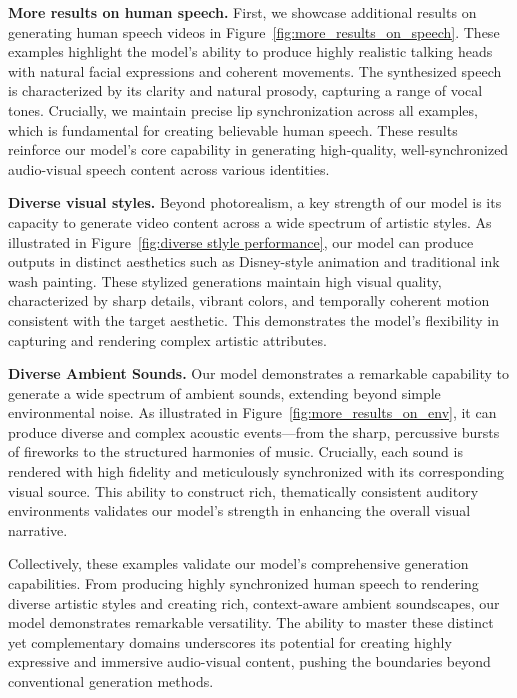 \noindent\textbf{More results on human speech.} 
First, we showcase additional results on generating human speech videos in Figure~\ref{fig:more_results_on_speech}. These examples highlight the model's ability to produce highly realistic talking heads with natural facial expressions and coherent movements. The synthesized speech is characterized by its clarity and natural prosody, capturing a range of vocal tones. Crucially, we maintain precise lip synchronization across all examples, which is fundamental for creating believable human speech. These results reinforce our model's core capability in generating high-quality, well-synchronized audio-visual speech content across various identities.

\noindent\textbf{Diverse visual styles.} 
Beyond photorealism, a key strength of our model is its capacity to generate video content across a wide spectrum of artistic styles. As illustrated in Figure~\ref{fig:diverse stlyle performance}, our model can produce outputs in distinct aesthetics such as Disney-style animation and traditional ink wash painting. These stylized generations maintain high visual quality, characterized by sharp details, vibrant colors, and temporally coherent motion consistent with the target aesthetic. This demonstrates the model's flexibility in capturing and rendering complex artistic attributes.

\noindent\textbf{Diverse Ambient Sounds.} 
Our model demonstrates a remarkable capability to generate a wide spectrum of ambient sounds, extending beyond simple environmental noise. As illustrated in Figure~\ref{fig:more_results_on_env}, it can produce diverse and complex acoustic events—from the sharp, percussive bursts of fireworks to the structured harmonies of music. Crucially, each sound is rendered with high fidelity and meticulously synchronized with its corresponding visual source. This ability to construct rich, thematically consistent auditory environments validates our model's strength in enhancing the overall visual narrative.

Collectively, these examples validate our model's comprehensive generation capabilities. From producing highly synchronized human speech to rendering diverse artistic styles and creating rich, context-aware ambient soundscapes, our model demonstrates remarkable versatility. The ability to master these distinct yet complementary domains underscores its potential for creating highly expressive and immersive audio-visual content, pushing the boundaries beyond conventional generation methods.
